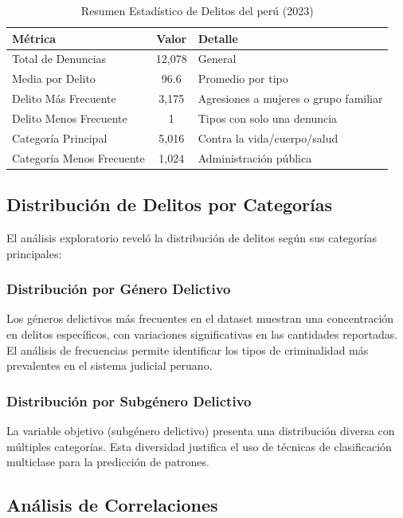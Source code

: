 \documentclass[conference]{IEEEtran}
\begin{document}
\begin{table}[htbp]
\caption{Resumen Estadístico de Delitos del perú (2023)}
\begin{center}
\begin{tabular}{|l|c|l|}
\hline
\textbf{Métrica} & \textbf{Valor} & \textbf{Detalle} \\
\hline
Total de Denuncias & 12,078 & General \\
\hline
Media por Delito & 96.6 & Promedio por tipo \\
\hline
Delito Más Frecuente & 3,175 & Agresiones a mujeres o grupo familiar \\
\hline
Delito Menos Frecuente & 1 & Tipos con solo una denuncia \\
\hline
Categoría Principal & 5,016 & Contra la vida/cuerpo/salud \\
\hline
Categoría Menos Frecuente & 1,024 & Administración pública \\
\hline
\end{tabular}
\label{tab:resumen_delitos}
\end{center}
\end{table}


\subsection{Distribución de Delitos por Categorías}

El análisis exploratorio reveló la distribución de delitos según sus categorías principales:

\subsubsection{Distribución por Género Delictivo}
Los géneros delictivos más frecuentes en el dataset muestran una concentración en delitos específicos, con variaciones significativas en las cantidades reportadas. El análisis de frecuencias permite identificar los tipos de criminalidad más prevalentes en el sistema judicial peruano.

\subsubsection{Distribución por Subgénero Delictivo}
La variable objetivo (subgénero delictivo) presenta una distribución diversa con múltiples categorías. Esta diversidad justifica el uso de técnicas de clasificación multiclase para la predicción de patrones.

\subsection{Análisis de Correlaciones}
\end{document}
